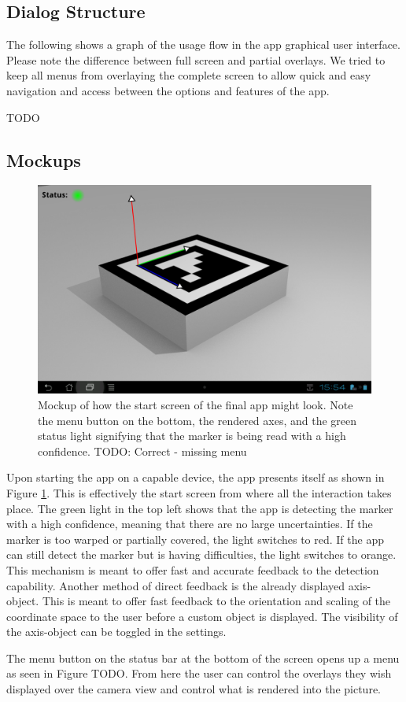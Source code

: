 \subsection{Dialog Structure}

The following shows a graph of the usage flow in the app graphical user interface.
Please note the difference between full screen and partial overlays.
We tried to keep all menus from overlaying the complete screen to allow quick and easy navigation and access between the options and features of the app.

TODO

\subsection{Mockups}

\begin{figure}
	\centering
	\includegraphics[width=15cm]{images/start_mockup.png}
	\caption[Start screen mockup.]{Mockup of how the start screen of the final app might look. Note the menu button on the bottom, the rendered axes, and the green status light signifying that the marker is being read with a high confidence. TODO: Correct - missing menu}
	\label{fig:start_mockup}
\end{figure}

Upon starting the app on a capable device, the app presents itself as shown in Figure \ref{fig:start_mockup}.
This is effectively the start screen from where all the interaction takes place.
The green light in the top left shows that the app is detecting the marker with a high confidence, meaning that there are no large uncertainties.
If the marker is too warped or partially covered, the light switches to red.
If the app can still detect the marker but is having difficulties, the light switches to orange.
This mechanism is meant to offer fast and accurate feedback to the detection capability.
Another method of direct feedback is the already displayed axis-object.
This is meant to offer fast feedback to the orientation and scaling of the coordinate space to the user before a custom object is displayed.
The visibility of the axis-object can be toggled in the settings.

The menu button on the status bar at the bottom of the screen opens up a menu as seen in Figure TODO.
From here the user can control the overlays they wish displayed over the camera view and control what is rendered into the picture.
